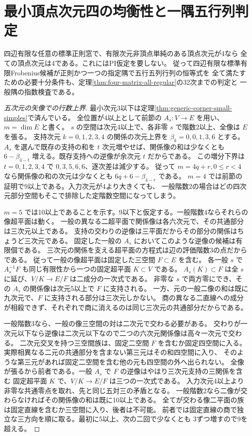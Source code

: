 \section{最小頂点次元四の均衡性と一隅五行列判定}
\label{sec:single-five-matrix-corner}
\begin{theorem}\label{thm:single-five-matrix-corner}
四辺有限な任意の標準正則窓で、有限次元非頂点単純のある頂点次元が4なら
全ての頂点次元は4である。これにはPI仮定を要しない。
従って四辺有限な標準有限Frobenius候補が正則かつ一つの指定隅で五行五列行列の恒等式を
全て満たすための必要十分条件も、定理\ref{thm:four-matrix-all-regular}の32次までの判定と
一般隅の指数検査である。
\end{theorem}
\begin{proof}[五次元の矢像での行数上界]
最小次元3以下は定理\ref{thm:generic-corner-small-simples}で済んでいる。
全位置が4以上として前節の $A_s:V\to E$ を用い、$m=\dim E$ と書く。
$s$ の空間は次元4以上で、各非零 $s$ で階数2以上、全像は $E$ を張る。
支持次元 $k=0,1,2,3,4$ の関係の次元上界を $\beta_k=0,0,1,3,6$ とする。
$A_s$ を選んで既存の支持の和を $t$ 次元増やせば、関係像の和は少なくとも
$6-\beta_{4-t}$ 増える。既存支持への逆像が余次元 $t$ だからである。
この増分下界は $t=0,1,2,3,4$ で $0,3,5,6,6$、逐次差は減少する。
従って $m=4q+r,0\le r<4$ なら関係像の和の次元は少なくとも $6q+6-\beta_{4-r}$ である。
$m=4$ では前節の証明で9以上である。入力次元が4より大きくても、
一般階数2の場合はどの四次元部分空間もそこで排除した定階数空間になってしまう。

$m=5$ では10以上であることを示す。9以下と仮定する。一般階数4ならそれらの像超平面は動く。
一般の異なる二超平面で関係像は各六次元で、その共通部分は三次元以上である。
支持の交わりの逆像は三平面だからその部分の関係はちょうど三次元である。
固定した一般の $A_s$ においてこのような逆像の候補は有限個である。
三次元の関係を支える超平面の方程式は辺の評価階数3の点だからである。
従って一般の像超平面は固定した三空間 $F\subset E$ を含む。
各一般 $s$ で $A_s^{-1}F$ も同じ有限性から一つの固定超平面 $K\subset V$ である。
$A_s(K)\subset F$ は全 $s$ に延び、$V/K\to E/F$ は二成分の一次式である。
非零な $s$ で両方零にでき、その $A_s$ の関係像は次元5以上で $F$ に支持される。
一方、元の一般二像の和は既に九次元で、$F$ に支持される部分は三次元しかない。
商の異なる二直線への成分が相殺できず、それぞれで商に消えるのは同じ三次元の共通部分だからである。

一般階数3なら、一般の像三空間の対は二次元で交わる必要がある。
交わりが一次元以下なら逆像は二次元以下なので二つの六次元関係像は高々一次元で交わる。
二次元交叉を持つ三空間族は、固定二空間 $F$ を含むか固定四空間に入る。
実際相異なる二元の共通部分を含まない第三元はその和四空間に入り、
そのような第三元があれば固定二空間を含む他の元も四空間の外へ出られない。
全像が張るから前者である。一般 $A_s$ で $F$ の逆像はやはり三次元支持の三関係を含む
固定超平面 $K$ で、$V/K\to E/F$ は三つの一次式である。
入力次元4以上より非零な共通零点を取れ、先と同じ五対三の矛盾となる。
一般階数2なら二像が交わらなければその関係像の和は既に10以上である。
全てが交わる像二平面の族は固定直線を含むか三空間に入り、後者は不可能。
前者では固定直線の商で独立な三方向を順に取る。最初に5以上、次の二回で少なくとも
3ずつ増すので9を超える。


\end{proof}
